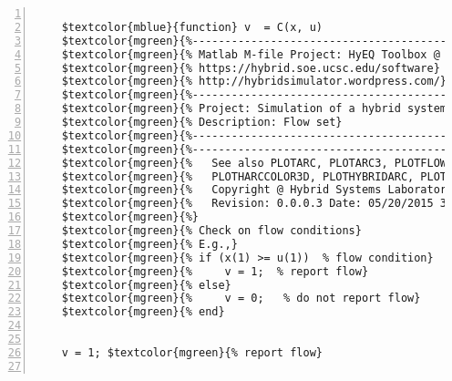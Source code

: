%  
%  
%  
%  
  
  
\DefineShortVerb[fontfamily=courier,fontseries=m]{\$} 
\DefineShortVerb[fontfamily=courier,fontseries=b]{\#} 
  
\begin{Verbatim}[commandchars=\$\{\},numbers=left,numbersep=2pt] 

    $textcolor{mblue}{function} v  = C(x, u)  
    $textcolor{mgreen}{%--------------------------------------------------------------------------} 
    $textcolor{mgreen}{% Matlab M-file Project: HyEQ Toolbox @  Hybrid Systems Laboratory (HSL), } 
    $textcolor{mgreen}{% https://hybrid.soe.ucsc.edu/software} 
    $textcolor{mgreen}{% http://hybridsimulator.wordpress.com/} 
    $textcolor{mgreen}{%--------------------------------------------------------------------------} 
    $textcolor{mgreen}{% Project: Simulation of a hybrid system} 
    $textcolor{mgreen}{% Description: Flow set} 
    $textcolor{mgreen}{%--------------------------------------------------------------------------} 
    $textcolor{mgreen}{%--------------------------------------------------------------------------} 
    $textcolor{mgreen}{%   See also PLOTARC, PLOTARC3, PLOTFLOWS, PLOTHARC, PLOTHARCCOLOR,} 
    $textcolor{mgreen}{%   PLOTHARCCOLOR3D, PLOTHYBRIDARC, PLOTJUMPS.} 
    $textcolor{mgreen}{%   Copyright @ Hybrid Systems Laboratory (HSL),} 
    $textcolor{mgreen}{%   Revision: 0.0.0.3 Date: 05/20/2015 3:42:00} 
    $textcolor{mgreen}{%} 
    $textcolor{mgreen}{% Check on flow conditions} 
    $textcolor{mgreen}{% E.g.,} 
    $textcolor{mgreen}{% if (x(1) >= u(1))  % flow condition} 
    $textcolor{mgreen}{%     v = 1;  % report flow} 
    $textcolor{mgreen}{% else} 
    $textcolor{mgreen}{%     v = 0;   % do not report flow} 
    $textcolor{mgreen}{% end} 
     
     
    v = 1; $textcolor{mgreen}{% report flow} 
          
\end{Verbatim}  
  
\UndefineShortVerb{\$} 
\UndefineShortVerb{\#} 
 